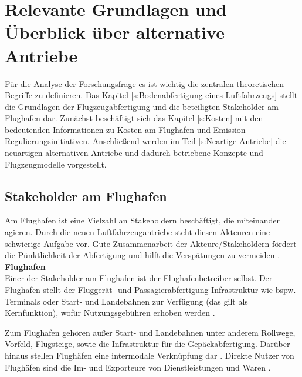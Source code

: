 \chapter{Relevante Grundlagen und Überblick über alternative Antriebe}
\label{ch:Relevante Grundlagen und Überblick über alternative Antriebe}
Für die Analyse der Forschungsfrage es ist wichtig die zentralen theoretischen Begriffe zu definieren. 
Das Kapitel \ref{s:Bodenabfertigung eines Luftfahrzeugs} stellt die Grundlagen der Flugzeugabfertigung und 
die beteiligten Stakeholder am Flughafen dar. Zunächst beschäftigt sich das Kapitel \ref{s:Kosten}
mit den bedeutenden Informationen zu Kosten am Flughafen und Emission-Regulierungsinitiativen. 
Anschließend werden im Teil \ref{s:Neartige Antriebe}
die neuartigen alternativen Antriebe und dadurch betriebene Konzepte und Flugzeugmodelle vorgestellt.

\section{Stakeholder am Flughafen}
\label{s:Stakeholder am Flughafen}
%
Am Flughafen ist eine Vielzahl an Stakeholdern beschäftigt, die miteinander agieren. Durch die neuen Luftfahrzeugantriebe 
steht diesen Akteuren eine schwierige Aufgabe vor. Gute Zusammenarbeit der Akteure/Stakeholdern fördert 
die Pünktlichkeit der Abfertigung und hilft die 
Verspätungen zu vermeiden \cite{schmidt2016challenges}.\\

\textbf{Flughafen} \\
Einer der Stakeholder am Flughafen ist der Flughafenbetreiber selbst. 
Der Flughafen stellt der Fluggerät- und Passagierabfertigung Infrastruktur wie bspw. Terminals oder Start- und Landebahnen zur Verfügung (das gilt als Kernfunktion), 
wofür Nutzungsgebühren erhoben werden \cite{conrady2019luftverkehr}. %

Zum Flughafen gehören außer Start- und Landebahnen unter anderem Rollwege, Vorfeld, Flugsteige, sowie die Infrastruktur für die Gepäckabfertigung. 
%
Darüber hinaus stellen Flughäfen eine intermodale Verknüpfung dar \cite{conrady2019luftverkehr}. %
Direkte Nutzer von Flughäfen sind die Im- und Exporteure von Dienstleistungen und Waren \cite{schaar2010analysis}. 

